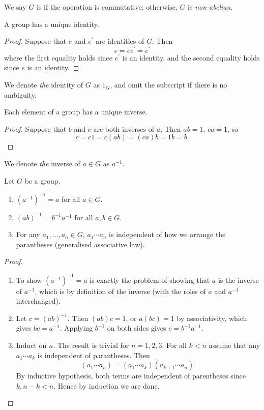 We say $G$ is  if the operation is commutative; otherwise, $G$ is \emph{non-abelian}.

\begin{lemma}
A group has a unique identity.
\end{lemma}

\begin{proof}
Suppose that $e$ and $e^\prime$ are identities of $G$. Then
\[e=ee^\prime=e^\prime\]
where the first equality holds since $e^\prime$ is an identity, and the second equality holds since $e$ is an identity.
\end{proof}

\begin{notation}
We denote \emph{the} identity of $G$ as $1_G$, and omit the subscript if there is no ambiguity.
\end{notation}

\begin{lemma}
Each element of a group has a unique inverse.
\end{lemma}

\begin{proof}
Suppose that $b$ and $c$ are both inverses of $a$. Then $ab=1$, $ca=1$, so
\[c=c1=c(ab)=(ca)b=1b=b.\]
\end{proof}

\begin{notation}
We denote \emph{the} inverse of $a\in G$ as $a^{-1}$.
\end{notation}

\begin{lemma}
Let $G$ be a group.
\begin{enumerate}[label=(\roman*)]
\item $(a^{-1})^{-1}=a$ for all $a\in G$.
\item $(ab)^{-1}=b^{-1}a^{-1}$ for all $a,b\in G$.
\item For any $a_1,\dots,a_n\in G$, $a_1\cdots a_n$ is independent of how we arrange the parantheses (generalised associative law).
\end{enumerate}
\end{lemma}

\begin{proof} \
\begin{enumerate}[label=(\roman*)]
\item To show $(a^{-1})^{-1}=a$ is exactly the problem of showing that $a$ is the inverse of $a^{-1}$, which is by definition of the inverse (with the roles of $a$ and $a^{-1}$ interchanged).

\item Let $c=(ab)^{-1}$. Then $(ab)c=1$, or $a(bc)=1$ by associativity, which gives $bc=a^{-1}$. Applying $b^{-1}$ on both sides gives $c=b^{-1}a^{-1}$.

\item Induct on $n$. The result is trivial for $n=1,2,3$. For all $k<n$ assume that any $a_1\cdots a_k$ is independent of parantheses. Then
\[(a_1\cdots a_n)=(a_1\cdots a_k)(a_{k+1}\cdots a_n).\]
By inductive hypothesis, both terms are independent of parentheses since $k,n-k<n$. Hence by induction we are done.
\end{enumerate}
\end{proof}

